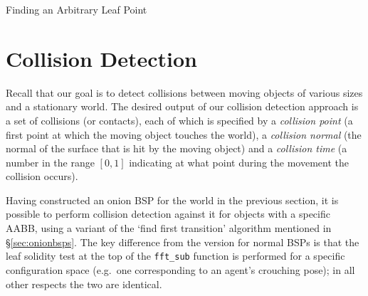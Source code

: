 \documentclass[10pt,twocolumn]{article}
\begin{document}
\begin{stulisting}[tp]
\caption{Finding an Arbitrary Leaf Point}
\label{code:arbitrary-leaf-point}

\end{stulisting}

\section{Collision Detection}
\label{sec:collisiondetection}

Recall that our goal is to detect collisions between moving objects of various sizes and a stationary world. The desired output of our collision detection approach is a set of collisions (or contacts), each of which is specified by a \emph{collision point} (a first point at which the moving object touches the world), a \emph{collision normal} (the normal of the surface that is hit by the moving object) and a \emph{collision time} (a number in the range $[0,1]$ indicating at what point during the movement the collision occurs).

Having constructed an onion BSP for the world in the previous section, it is possible to perform collision detection against it for objects with a specific AABB, using a variant of the `find first transition' algorithm mentioned in \S\ref{sec:onionbsps}. The key difference from the version for normal BSPs is that the leaf solidity test at the top of the \texttt{fft\_sub} function is performed for a specific configuration space (e.g.~one corresponding to an agent's crouching pose); in all other respects the two are identical.
\end{document}
